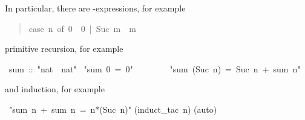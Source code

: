 \begin{isabelle}%
%
\begin{isamarkuptext}%
\noindent
In particular, there are -expressions, for example
\begin{quote}

\begin{isabelle}%
case\ \mbox{n}\ of\ 0\ {\isasymRightarrow}\ 0\ |\ Suc\ \mbox{m}\ {\isasymRightarrow}\ \mbox{m}
\end{isabelle}%

\end{quote}
primitive recursion, for example%
\end{isamarkuptext}%
\ sum\ ::\ {"}nat\ {\isasymRightarrow}\ nat{"}\isanewline
{}\ {"}sum\ 0\ =\ 0{"}\isanewline
\ \ \ \ \ \ \ \ {"}sum\ (Suc\ n)\ =\ Suc\ n\ +\ sum\ n{"}%
\begin{isamarkuptext}%
\noindent
and induction, for example%
\end{isamarkuptext}%
\ {"}sum\ n\ +\ sum\ n\ =\ n*(Suc\ n){"}\isanewline
{}(induct\_tac\ n)\isanewline
{}(auto)\isanewline
\end{isabelle}%

